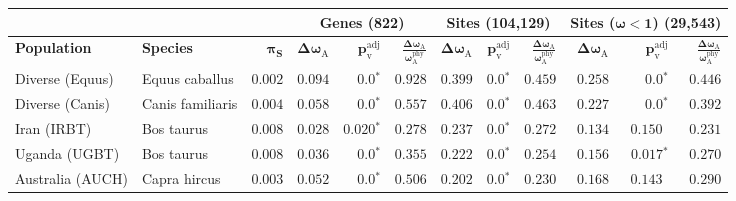 \documentclass{article}
\newcommand{\rateApop}{\omega_{\mathrm{A}}}
\newcommand{\rateAphy}{\rateApop^{\mathrm{phy}}}
\begin{document}
    \begin{table*}[tb]
        \centering
        \begin{adjustbox}{width = 0.95\textwidth}
            \begin{tabular}{||l|l|r||r|r|r||r|r|r||r|r|r||}
                \toprule
                \multicolumn{3}{||c||}{} &
                \multicolumn{3}{c||}{\textbf{Genes (822)}} &
                \multicolumn{3}{c||}{\textbf{Sites (104,129)}} &
                \multicolumn{3}{c||}{\textbf{Sites ($\bm{\omega < 1}$) (29,543)}}
                \\ \hline
                \textbf{Population} &
                \textbf{Species} &
                $\bm{\pi_{\textrm{S}}}$ &
                $\bm{\Delta \rateApop}$ &
                $\bm{p_{\mathrm{v}}^{\mathrm{adj}}}$    &
                $\bm{\frac{\Delta\rateApop}{\rateAphy}}$ &
                $\bm{\Delta \rateApop}$ &
                $\bm{p_{\mathrm{v}}^{\mathrm{adj}}}$          &
                $\bm{\frac{\Delta\rateApop}{\rateAphy}}$ &
                $\bm{\Delta \rateApop}$ &
                $\bm{p_{\mathrm{v}}^{\mathrm{adj}}}$ &
                $\bm{\frac{\Delta\rateApop}{\rateAphy}}$
                \\                \midrule
                Diverse (Equus)                                     & Equus caballus      & $ 0.002$ & $ 0.094$ & $\bm{0.0{^*}}$    & $ 0.928$ & $ 0.399$ & $\bm{0.0{^*}}$ & $ 0.459$ & $ 0.258$ & $\bm{0.0{^*}}$ & $ 0.446$ \\
                \rowcolor{LIGHTGREY} Diverse (Canis)                & Canis familiaris    & $ 0.004$ & $ 0.058$ & $\bm{0.0{^*}}$                  & $ 0.557$                                                                     & $ 0.406$ & $\bm{0.0{^*}}$ & $ 0.463$ & $ 0.227$ & $\bm{0.0{^*}}$ & $ 0.392$ \\
                Iran (IRBT)                                         & Bos taurus          & $ 0.008$ & $ 0.028$ & $\bm{ 0.020{^*}}$ & $ 0.278$ & $ 0.237$ & $\bm{0.0{^*}}$ & $ 0.272$ & $ 0.134$ & $ 0.150~~$ & $ 0.231$ \\
                Uganda (UGBT)                                       & Bos taurus          & $ 0.008$ & $ 0.036$ & $\bm{0.0{^*}}$    & $ 0.355$ & $ 0.222$ & $\bm{0.0{^*}}$ & $ 0.254$ & $ 0.156$ & $\bm{ 0.017{^*}}$ & $ 0.270$ \\
                \rowcolor{LIGHTGREY} Australia (AUCH)               & Capra hircus        & $ 0.003$ & $ 0.052$ & $\bm{0.0{^*}}$                  & $ 0.506$                                                                     & $ 0.202$ & $\bm{0.0{^*}}$ & $ 0.230$ & $ 0.168$ & $ 0.143~~$ & $ 0.290$ \\

\end{tabular}
\end{adjustbox}
\end{table*}
\end{document}
